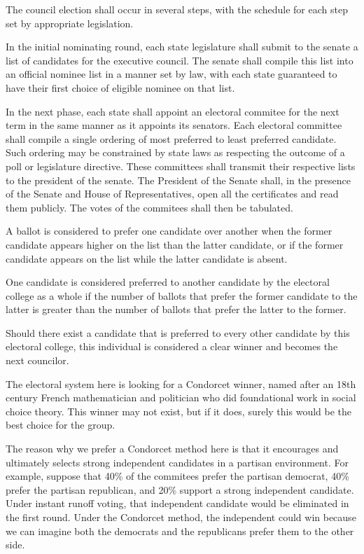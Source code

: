 \documentclass{article}
\begin{document}
\begin{quoting}
The council election shall occur in several steps, with the schedule for each step set by appropriate legislation.

In the initial nominating round, each state legislature shall submit to the senate a list of candidates for the executive council. The senate shall compile this list into an official nominee list in a manner set by law, with each state guaranteed to have their first choice of eligible nominee on that list.

In the next phase, each state shall appoint an electoral commitee for the next term in the same manner as it appoints its senators. Each electoral committee shall compile a single ordering of most preferred to least preferred candidate. Such ordering may be constrained by state laws as respecting the outcome of a poll or legislature directive. These committees shall transmit their respective lists to the president of the senate.  The President of the Senate shall, in the presence of the Senate and House of Representatives, open all the certificates and read them publicly. The votes of the commitees shall then be tabulated.

A ballot is considered to prefer one candidate over another when the former candidate appears higher on the list than the latter candidate, or if the former candidate appears on the list while the latter candidate is absent.

One candidate is considered preferred to another candidate by the electoral college as a whole if the number of ballots that prefer the former candidate to the latter is greater than the number of ballots that prefer the latter to the former.

Should there exist a candidate that is preferred to every other candidate by this electoral college, this individual is considered a clear winner and becomes the next councilor.
\end{quoting}

The electoral system here is looking for a Condorcet winner, named after an 18th century French mathematician and politician who did foundational work in social choice theory. This winner may not exist, but if it does, surely this would be the best choice for the group.

The reason why we prefer a Condorcet method here is that it encourages and ultimately selects strong independent candidates in a partisan environment. For example, suppose that 40\% of the commitees prefer the partisan democrat, 40\% prefer the partisan republican, and 20\% support a strong independent candidate. Under instant runoff voting, that independent candidate would be eliminated in the first round. Under the Condorcet method, the independent could win because we can imagine both the democrats and the republicans prefer them to the other side.
\end{document}
